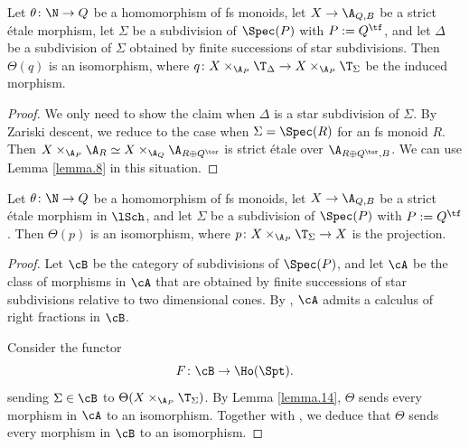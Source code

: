 \documentclass[10pt]{amsart}
\begin{document}
\begin{lem}
\label{lemma.14}
Let $\theta\colon \N\to Q$ be a homomorphism of fs monoids, let $X\to \A_{Q,B}$ be a strict \'etale morphism, let $\Sigma$ be a subdivision of $\Spec(P)$ with $P:=Q^\tf$, and let $\Delta$ be a subdivision of $\Sigma$ obtained by finite successions of star subdivisions.
Then $\Theta(q)$ is an isomorphism, where $q\colon X\times_{\A_{P}}\T_{\Delta}\to X\times_{\A_{P}}\T_{\Sigma}$ be the induced morphism.
\end{lem}
\begin{proof}
We only need to show the claim when $\Delta$ is a star subdivision of $\Sigma$.
By Zariski descent, we reduce to the case when $\Sigma= \Spec(R)$ for an fs monoid $R$.
Then $X\times_{\A_P}\A_R\simeq X\times_{\A_Q}\A_{R\oplus Q^\tor}$ is strict \'etale over $\A_{R\oplus Q^\tor,B}$.
We can use Lemma \ref{lemma.8} in this situation.
\end{proof}

\begin{lem}
\label{lemma.13}
Let $\theta\colon \N\to Q$ be a homomorphism of fs monoids, let $X\to \A_{Q,B}$ be a strict \'etale morphism in $\lSch$, and let $\Sigma$ be a subdivision of $\Spec(P)$ with $P:=Q^\tf$.
Then $\Theta(p)$ is an isomorphism, where $p\colon X\times_{\A_{P}}\T_{\Sigma}\to X$ is the projection.
\end{lem}
\begin{proof}
Let $\cB$ be the category of subdivisions of $\Spec(P)$, and let $\cA$ be the class of morphisms in $\cA$ that are obtained by finite successions of star subdivisions relative to two dimensional cones.
By \cite[Lemma A.3.15]{logDM}, $\cA$ admits a calculus of right fractions in $\cB$.

Consider the functor
\[
F\colon \cB\to \Ho(\Spt).
\]
sending $\Sigma\in \cB$ to $\Theta(X\times_{\A_{P}}\T_{\Sigma})$.
By Lemma \ref{lemma.14}, $\Theta$ sends every morphism in $\cA$ to an isomorphism.
Together with \cite[Lemmas A.3.15, C.2.1]{logDM}, we deduce that $\Theta$ sends every morphism in $\cB$ to an isomorphism.
\end{proof}
\end{document}

